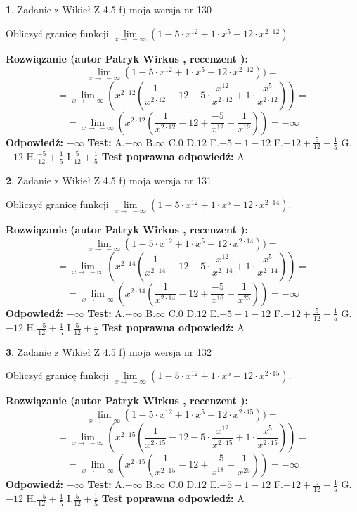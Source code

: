 \documentclass[12pt, a4paper]{article}
\theoremstyle{definition} %
\newtheorem{zad}{}
\newcommand{\zadStart}[1]{\begin{zad}#1\newline}
\newcommand{\zadStop}{\end{zad}}
\newcommand{\rozwStart}[2]{\noindent \textbf{Rozwiązanie (autor #1 , recenzent #2): }\newline}
\newcommand{\rozwStop}{\newline}
\newcommand{\odpStart}{\noindent \textbf{Odpowiedź:}\newline}
\newcommand{\odpStop}{\newline}
\newcommand{\testStart}{\noindent \textbf{Test:}\newline}
\newcommand{\testStop}{\newline}
\newcommand{\kluczStart}{\noindent \textbf{Test poprawna odpowiedź:}\newline}
\newcommand{\kluczStop}{\newline}
\begin{document}
\zadStart{Zadanie z Wikieł Z 4.5 f) moja wersja nr 130}



Obliczyć granicę funkcji  $\lim\limits_{x\to\ -\infty}(1 - 5 \cdot x^{12}+1 \cdot x^{5}- 12 \cdot x^{2\cdot12})$.
\zadStop
\rozwStart{Patryk Wirkus}{}
$$\lim\limits_{x\to\ -\infty}(1 - 5 \cdot x^{12}+1 \cdot x^{5}- 12 \cdot x^{2\cdot12}))=$$
$$=\lim\limits_{x\to\ -\infty}(x^{2\cdot12}(\frac{1}{x^{2\cdot12}}-12 -5 \cdot \frac{x^{12}}{x^{2\cdot12}}+1 \cdot \frac{x^{5}}{x^{2\cdot12}}))=$$
$$=\lim\limits_{x\to\ -\infty}(x^{2\cdot12}(\frac{1}{x^{2\cdot12}}-12 + \frac{-5}{x^{12}}+ \frac{1}{x^{19}}))=-\infty$$
\rozwStop
\odpStart
$-\infty$
\odpStop
\testStart
A.$-\infty$ B.$\infty$ C.$0$ D.$12$ E.$-5 + 1 - 12$
F.$-12+\frac{5}{12}+\frac{1}{5}$ G.$-12$
H.$\frac{-5}{12}+\frac{1}{5}$
I.$\frac{5}{12}+\frac{1}{5}$
\testStop
\kluczStart
A
\kluczStop



\zadStart{Zadanie z Wikieł Z 4.5 f) moja wersja nr 131}



Obliczyć granicę funkcji  $\lim\limits_{x\to\ -\infty}(1 - 5 \cdot x^{12}+1 \cdot x^{5}- 12 \cdot x^{2\cdot14})$.
\zadStop
\rozwStart{Patryk Wirkus}{}
$$\lim\limits_{x\to\ -\infty}(1 - 5 \cdot x^{12}+1 \cdot x^{5}- 12 \cdot x^{2\cdot14}))=$$
$$=\lim\limits_{x\to\ -\infty}(x^{2\cdot14}(\frac{1}{x^{2\cdot14}}-12 -5 \cdot \frac{x^{12}}{x^{2\cdot14}}+1 \cdot \frac{x^{5}}{x^{2\cdot14}}))=$$
$$=\lim\limits_{x\to\ -\infty}(x^{2\cdot14}(\frac{1}{x^{2\cdot14}}-12 + \frac{-5}{x^{16}}+ \frac{1}{x^{23}}))=-\infty$$
\rozwStop
\odpStart
$-\infty$
\odpStop
\testStart
A.$-\infty$ B.$\infty$ C.$0$ D.$12$ E.$-5 + 1 - 12$
F.$-12+\frac{5}{12}+\frac{1}{5}$ G.$-12$
H.$\frac{-5}{12}+\frac{1}{5}$
I.$\frac{5}{12}+\frac{1}{5}$
\testStop
\kluczStart
A
\kluczStop



\zadStart{Zadanie z Wikieł Z 4.5 f) moja wersja nr 132}



Obliczyć granicę funkcji  $\lim\limits_{x\to\ -\infty}(1 - 5 \cdot x^{12}+1 \cdot x^{5}- 12 \cdot x^{2\cdot15})$.
\zadStop
\rozwStart{Patryk Wirkus}{}
$$\lim\limits_{x\to\ -\infty}(1 - 5 \cdot x^{12}+1 \cdot x^{5}- 12 \cdot x^{2\cdot15}))=$$
$$=\lim\limits_{x\to\ -\infty}(x^{2\cdot15}(\frac{1}{x^{2\cdot15}}-12 -5 \cdot \frac{x^{12}}{x^{2\cdot15}}+1 \cdot \frac{x^{5}}{x^{2\cdot15}}))=$$
$$=\lim\limits_{x\to\ -\infty}(x^{2\cdot15}(\frac{1}{x^{2\cdot15}}-12 + \frac{-5}{x^{18}}+ \frac{1}{x^{25}}))=-\infty$$
\rozwStop
\odpStart
$-\infty$
\odpStop
\testStart
A.$-\infty$ B.$\infty$ C.$0$ D.$12$ E.$-5 + 1 - 12$
F.$-12+\frac{5}{12}+\frac{1}{5}$ G.$-12$
H.$\frac{-5}{12}+\frac{1}{5}$
I.$\frac{5}{12}+\frac{1}{5}$
\testStop
\kluczStart
A
\kluczStop
\end{document}
